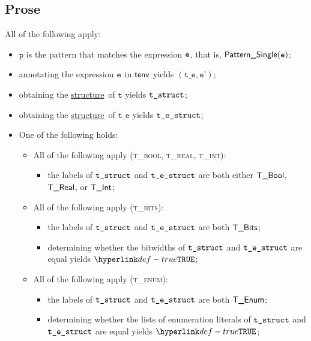 \documentclass{book}
\newcommand\ProseOrTypeError[0]{\ProseTerminateAs{\TypeErrorConfig}}
\newcommand\structure[0]{\hyperlink{def-structure}{structure}}
\newcommand\vp[0]{\texttt{p}}
\newcommand\vt[0]{\texttt{t}}
\newcommand\vte[0]{\texttt{t\_e}}
\newcommand\vep[0]{\texttt{e'}}
\begin{document}
\subsection{Prose}
All of the following apply:
\begin{itemize}
  \item $\vp$ is the pattern that matches the expression $\texttt{e}$, that is, $\textsf{Pattern\_Single}(\texttt{e})$;
  \item annotating the expression $\texttt{e}$ in $\textsf{tenv}$ yields $(\vte, \vep)$\ProseOrTypeError;
  \item obtaining the \structure\ of $\vt$ yields $\texttt{t\_struct}$\ProseOrTypeError;
  \item obtaining the \structure\ of $\vte$ yields $\texttt{t\_e\_struct}$\ProseOrTypeError;
  \item One of the following holds:
  \begin{itemize}
    \item All of the following apply (\textsc{t\_bool, t\_real, t\_int}):
    \begin{itemize}
      \item the labels of $\texttt{t\_struct}$ and $\texttt{t\_e\_struct}$ are both either $\textsf{T\_Bool}$, $\textsf{T\_Real}$, or $\textsf{T\_Int}$\ProseOrTypeError;
    \end{itemize}

    \item All of the following apply (\textsc{t\_bits}):
    \begin{itemize}
      \item the labels of $\texttt{t\_struct}$ and $\texttt{t\_e\_struct}$ are both $\textsf{T\_Bits}$\ProseOrTypeError;
      \item determining whether the bitwidths of $\texttt{t\_struct}$ and $\texttt{t\_e\_struct}$ are equal yields $\True$\ProseOrTypeError;
    \end{itemize}

    \item All of the following apply (\textsc{t\_enum}):
    \begin{itemize}
      \item the labels of $\texttt{t\_struct}$ and $\texttt{t\_e\_struct}$ are both $\textsf{T\_Enum}$\ProseOrTypeError;
      \item determining whether the lists of enumeration literals of $\texttt{t\_struct}$ and $\texttt{t\_e\_struct}$ are equal yields $\True$\ProseOrTypeError;
    \end{itemize}


\end{itemize}
\end{itemize}
\end{document}

